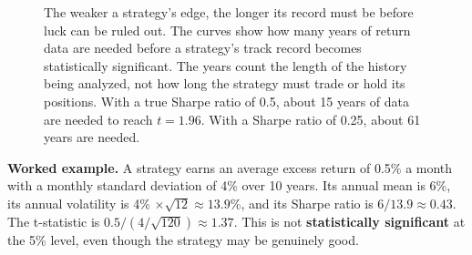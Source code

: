 \begin{figure}[!htbp]
  \centering
  \caption{The weaker a strategy's edge, the longer its record must be before luck can be ruled out. The curves show how many years of return data are needed before a strategy's track record becomes statistically significant. The years count the length of the history being analyzed, not how long the strategy must trade or hold its positions. With a true Sharpe ratio of 0.5, about 15 years of data are needed to reach $t = 1.96$. With a Sharpe ratio of 0.25, about 61 years are needed.}
  \label{fig:01-years}
\end{figure}



\textbf{Worked example.} A strategy earns an average excess return of 0.5\% a month with a monthly standard deviation of 4\% over 10 years. Its annual mean is 6\%, its annual volatility is 4\% $\times \sqrt{12} \approx 13.9$\%, and its Sharpe ratio is $6/13.9 \approx 0.43$. The t-statistic is $0.5 / (4/\sqrt{120}) \approx 1.37$. This is not \textbf{statistically significant} at the 5\% level, even though the strategy may be genuinely good.




